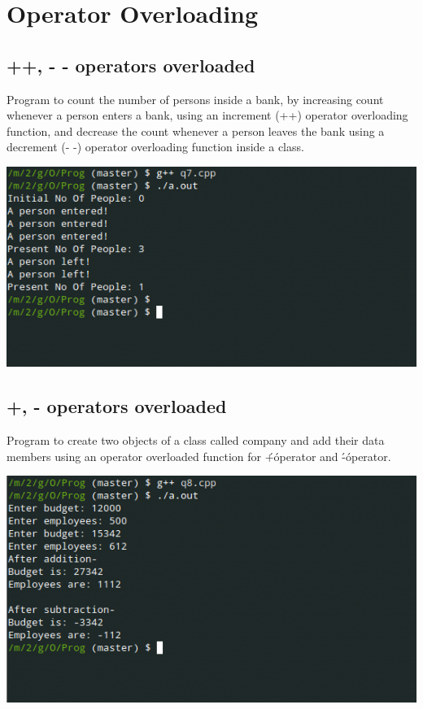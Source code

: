 \documentclass[oneside, a4paper,11pt]{book}
\begin{document}
\chapter{Operator Overloading}

\section{++, - - operators overloaded}

Program to count the number of persons inside a bank, by increasing count whenever a person enters a bank, using an increment (++) operator overloading function, and decrease the count whenever a person leaves the bank using a decrement (- -) operator overloading function inside a class. 


\includegraphics[width=\textwidth]{q7.png}

\section{+, - operators overloaded}

Program to create two objects of a class called company and add their data members using an operator overloaded function for \'+\' operator and \'-\' operator.


\includegraphics[width=\textwidth]{q8.png}
\end{document}
